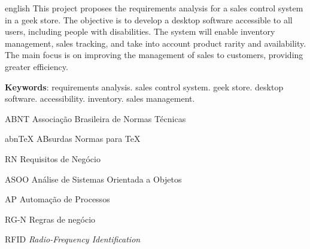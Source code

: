 \documentclass[
	12pt,				%
	openright,			%
	twoside,			%
	a4paper,			%
	english,			%
	brazil				%
	]{abntex2}
\newcommand{\listofquadrosname}{Lista de quadros}
\begin{document}
\begin{resumo}[Abstract]
 \begin{otherlanguage*}{english}
	This project proposes the requirements analysis for a sales control system in a geek store. The objective is to develop a desktop software accessible to all users, including people with disabilities. The system will enable inventory management, sales tracking, and take into account product rarity and availability. The main focus is on improving the management of sales to customers, providing greater efficiency.
   \vspace{\onelineskip}
 
   \noindent 
   \textbf{Keywords}: requirements analysis. sales control system. geek store. desktop software. accessibility. inventory. sales management.
 \end{otherlanguage*}
\end{resumo}

\listoffigures*
\cleardoublepage

\pdfbookmark[0]{\listofquadrosname}{loq}
\listofquadros*
\cleardoublepage

\listoftables*
\cleardoublepage

\begin{siglas}
	\item[ABNT] Associação Brasileira de Normas Técnicas
	\item[abnTeX] ABsurdas Normas para TeX
	\item[RN] Requisitos de Negócio
	\item[ASOO] Análise de Sistemas Orientada a Objetos
	\item[AP] Automação de Processos
	\item[RG-N] Regras de negócio
	\item[RFID] \textit{Radio-Frequency Identification}
\end{siglas}

\tableofcontents*
\cleardoublepage



\textual
\end{document}
